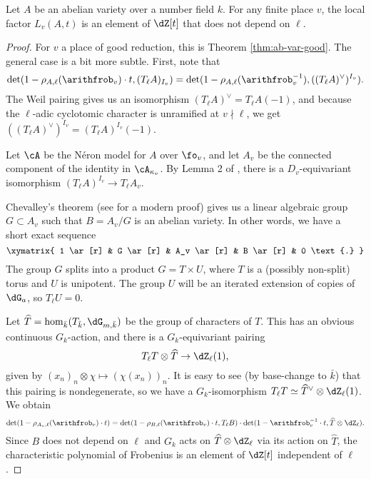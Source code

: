 \begin{theorem}
Let $A$ be an abelian variety over a number field $k$. For any finite place 
$v$, the local factor $L_v(A,t)$ is an element of $\dZ[t]$ that does not depend 
on $\ell$. 
\end{theorem}
\begin{proof}
For $v$ a place of good reduction, this is Theorem \ref{thm:ab-var-good}. The 
general case is a bit more subtle. First, note that 
\[
  \det(1-\rho_{A,\ell}(\arithfrob_v)\cdot t,(T_\ell A)_{I_v}) 
    = \det(1-\rho_{A,\ell}(\arithfrob_v^{-1}),((T_\ell A)^\vee)^{I_v}) \text{.}
\]
The Weil pairing gives us an isomorphism $(T_\ell A)^\vee= T_\ell A(-1)$, 
and because the $\ell$-adic cyclotomic character is unramified at 
$v\nmid \ell$, we get $((T_\ell A)^\vee)^{I_v} = (T_\ell A)^{I_v}(-1)$. 

Let $\cA$ be the N\'eron model for $A$ over 
$\fo_v$, and let $A_v$ be the connected component of the identity in 
$\cA_{\kappa_v}$. By Lemma 2 of \cite{st68}, there is a $D_v$-equivariant 
isomorphism $(T_\ell A)^{I_v} \to T_\ell A_v$. 

Chevalley's theorem (see \cite{co02} for a modern proof) gives us a linear 
algebraic group $G\subset A_v$ such that $B=A_v/G$ is an abelian variety. In 
other words, we have a short exact sequence 
\[\xymatrix{
  1 \ar[r] 
    & G \ar[r] 
    & A_v \ar[r] 
    & B \ar[r] 
    & 0 \text{.} 
}\]
The group $G$ splits into a product $G=T\times U$, where $T$ is a (possibly 
non-split) torus and $U$ is unipotent. The group $U$ will be an iterated 
extension of copies of $\dG_a$, so $T_\ell U=0$. 

Let $\widehat T=\hom_{\bar k}(T_{\bar k},\dG_{m,\bar k})$ be the group of 
characters of $T$. This has an obvious continuous $G_k$-action, and there is a 
$G_k$-equivariant pairing 
\[
  T_\ell T \otimes \widehat T \to \dZ_\ell(1) \text{,}
\]
given by $(x_n)_n\otimes \chi \mapsto (\chi(x_n))_n$. It is easy to see (by 
base-change to $\bar k$) that this pairing is nondegenerate, so we have a 
$G_k$-isomorphism $T_\ell T \simeq \widehat T^\vee \otimes \dZ_\ell(1)$. 
We obtain 
\[
  \det(1-\rho_{A_v,\ell}(\arithfrob_v)\cdot t) = \det(1-\rho_{B,\ell}(\arithfrob_v)\cdot t,T_\ell B) \cdot \det(1-\arithfrob_v^{-1}\cdot t,\widehat T\otimes \dZ_\ell) \text{.}
\]
Since $B$ does not depend on $\ell$ and $G_k$ acts on 
$\widehat T\otimes \dZ_\ell$ via its action on $\widehat T$, the characteristic 
polynomial of Frobenius is an element of $\dZ[t]$ independent of $\ell$. 
\end{proof}

